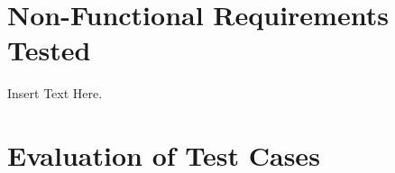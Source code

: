 \documentclass[12pt]{article}
\begin{document}
		



\section{Non-Functional Requirements Tested}
Insert Text Here.

\section{Evaluation of Test Cases}
\end{document}
